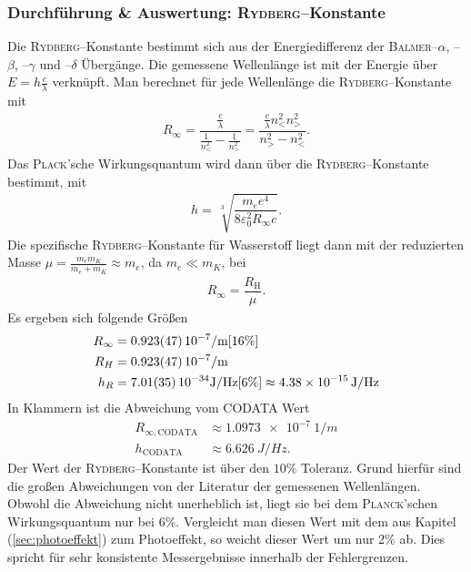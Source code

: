 \documentclass[sn-mathphys-num,iicol]{sn-jnl}
\theoremstyle{thmstyleone}
\theoremstyle{thmstyletwo}
\theoremstyle{thmstylethree}
\begin{document}
\subsubsection{Durchführung \& Auswertung: \textsc{Rydberg}--Konstante}
Die \textsc{Rydberg}--Konstante bestimmt sich aus der Energiedifferenz der \textsc{Balmer}--$\alpha $, --$\beta $, --$\gamma $ und --$\delta $ Übergänge.
Die gemessene Wellenlänge ist mit der Energie über $E=h\tfrac{c}{\lambda }$ verknüpft.
Man berechnet für jede Wellenlänge die \textsc{Rydberg}--Konstante mit
\begin{align} 
        R_\infty=\dfrac{\tfrac{c}{\lambda }}{\tfrac{1}{n_<^2}-\tfrac{1}{n_>^2}}=\dfrac{\tfrac{c}{\lambda }n_<^2n_>^2}{n_>^2-n_<^2}
.\end{align} 
Das \textsc{Plack}'sche Wirkungsquantum wird dann über die \textsc{Rydberg}--Konstante bestimmt, mit
\begin{align} 
        h=\,\sqrt[3]{\dfrac{m_e e^4}{8\varepsilon _0^2R_\infty c}}
.\end{align} 
Die spezifische \textsc{Rydberg}--Konstante für Wasserstoff liegt dann mit der reduzierten Masse $\mu =\tfrac{m_em_K}{m_e+m_K}\approx m_e$, da $m_e\ll m_K$, bei
\begin{align} 
        R_\infty=\dfrac{R_\text{H}}{\mu }
.\end{align} 
Es ergeben sich folgende Größen
\begin{align} 
        R_\infty&=\SI{0.923+-0.047}{10^{-7}/m}[16\%]\\
        R_{H}&=\SI{0.923+-0.047}{10^{-7}/m}\\
        h_R&=\SI{7.01+-0.35}{10^{-34}J/Hz}[6\%]\approx \SI{4.38e-15}{J/Hz}
\end{align} 
In Klammern ist die Abweichung vom CODATA\cite{CODATA} Wert
\begin{align} 
        R_{\infty,\text{CODATA}}&\approx \SI{1.0973e-7}{1/m}\\
        h_\text{CODATA}&\approx \SI{6.626}{J/Hz}
.\end{align} 
Der Wert der \textsc{Rydberg}--Konstante ist über den $10\%$ Toleranz.
Grund hierfür sind die großen Abweichungen von der Literatur der gemessenen Wellenlängen.
Obwohl die Abweichung nicht unerheblich ist, liegt sie bei dem \textsc{Planck}'schen Wirkungsquantum nur bei $6\%$.
Vergleicht man diesen Wert mit dem aus Kapitel (\ref{sec:photoeffekt}) zum Photoeffekt, so weicht dieser Wert um nur 2\% ab.
Dies spricht für sehr konsistente Messergebnisse innerhalb der Fehlergrenzen.
\end{document}
